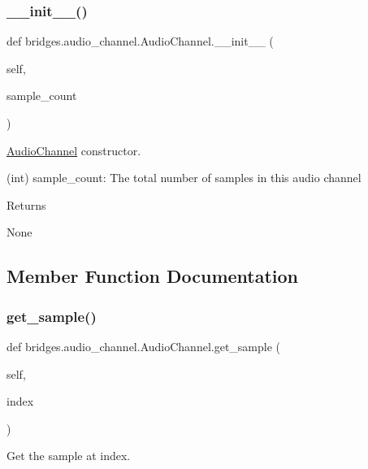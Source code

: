 \subsubsection{\texorpdfstring{\+\_\+\+\_\+init\+\_\+\+\_\+()}{\_\_init\_\_()}}
{\footnotesize\ttfamily def bridges.\+audio\+\_\+channel.\+Audio\+Channel.\+\_\+\+\_\+init\+\_\+\+\_\+ (\begin{DoxyParamCaption}\item[{}]{self,  }\item[{}]{sample\+\_\+count }\end{DoxyParamCaption})}



\hyperlink{classbridges_1_1audio__channel_1_1_audio_channel}{Audio\+Channel} constructor. 

(int) sample\+\_\+count\+: The total number of samples in this audio channel \begin{DoxyReturn}{Returns}


None 
\end{DoxyReturn}


\subsection{Member Function Documentation}
\mbox{\label{classbridges_1_1audio__channel_1_1_audio_channel_a1f695d07aa5c95866036b0a55f88d9ae}} 
\subsubsection{\texorpdfstring{get\+\_\+sample()}{get\_sample()}}
{\footnotesize\ttfamily def bridges.\+audio\+\_\+channel.\+Audio\+Channel.\+get\+\_\+sample (\begin{DoxyParamCaption}\item[{}]{self,  }\item[{}]{index }\end{DoxyParamCaption})}



Get the sample at index. 

